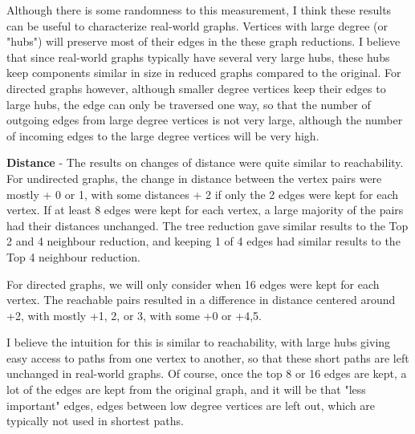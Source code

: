 \documentclass[11pt]{article}
\begin{document}
Although there is some randomness to this measurement, I think these results can be useful to characterize real-world graphs.  Vertices with large degree (or "hubs") will preserve most of their edges in the these graph reductions.  I believe that since real-world graphs typically have several very large hubs, these hubs keep components similar in size in reduced graphs compared to the original.  For directed graphs however, although smaller degree vertices keep their edges to large hubs, the edge can only be traversed one way, so that the number of outgoing edges from large degree vertices is not very large, although the number of incoming edges to the large degree vertices will be very high.

\textbf{Distance} - The results on changes of distance were quite similar to reachability.  For undirected graphs, the change in distance between the vertex pairs were mostly + 0 or 1, with some distances + 2 if only the 2 edges were kept for each vertex.  If at least 8 edges were kept for each vertex, a large majority of the pairs had their distances unchanged. The tree reduction gave similar results to the Top 2 and 4 neighbour reduction, and keeping 1 of 4 edges had similar results to the Top 4 neighbour reduction.

For directed graphs, we will only consider when 16 edges were kept for each vertex.  The reachable pairs resulted in a difference in distance centered around +2, with mostly +1, 2, or 3, with some +0 or +4,5.

I believe the intuition for this is similar to reachability, with large hubs giving easy access to paths from one vertex to another, so that these short paths are left unchanged in real-world graphs. Of course, once the top 8 or 16 edges are kept, a lot of the edges are kept from the original graph, and it will be that "less important" edges, edges between low degree vertices are left out, which are typically not used in shortest paths.
\end{document}
